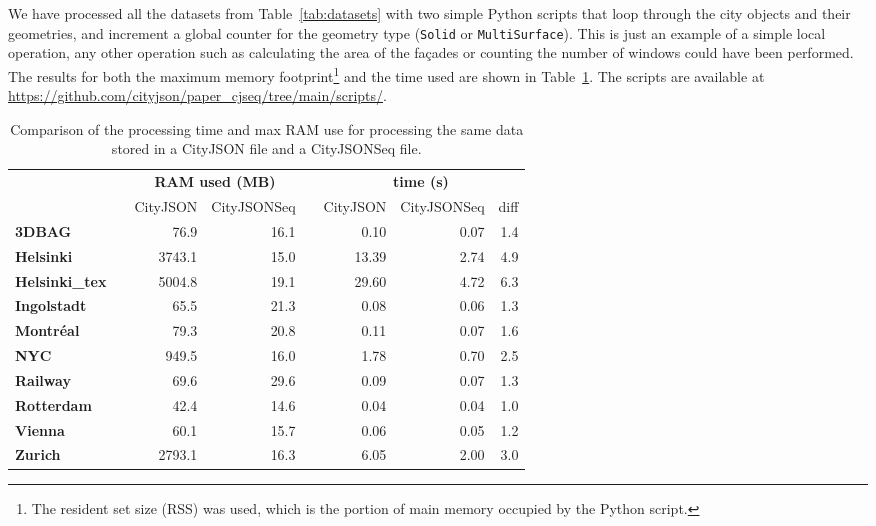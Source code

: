 \documentclass{isprs} %
\begin{document}
We have processed all the datasets from Table~\ref{tab:datasets} with two simple Python scripts that loop through the city objects and their geometries, and increment a global counter for the geometry type (\texttt{Solid} or \texttt{MultiSurface}).
This is just an example of a simple local operation, any other operation such as calculating the area of the façades or counting the number of windows could have been performed.
The results for both the maximum memory footprint\footnote{The resident set size (RSS) was used, which is the portion of main memory occupied by the Python script.} and the time used are shown in Table~\ref{tab:ramtime}.
The scripts are available at \url{https://github.com/cityjson/paper_cjseq/tree/main/scripts/}.
\begin{table}
  \centering
  \caption{Comparison of the processing time and max RAM use for processing the same data stored in a CityJSON file and a CityJSONSeq file.}
  \small
  \begin{tabular}
    {@{}lcrrcrrr@{}}\toprule
    &&  \multicolumn{2}{c}{\textbf{RAM used (MB)}} && \multicolumn{3}{c}{\textbf{time (s)}} \\ 
    \cmidrule{3-4} \cmidrule{6-8} 
     && CityJSON & CityJSONSeq && CityJSON & CityJSONSeq & diff \\
    \midrule
     \textbf{3DBAG}         &&   76.9 & 16.1  &&   0.10 & 0.07 & 1.4 \\
     \textbf{Helsinki}      && 3743.1 & 15.0  &&  13.39 & 2.74 & 4.9 \\
     \textbf{Helsinki\_tex} && 5004.8 & 19.1  &&  29.60 & 4.72 & 6.3 \\
     \textbf{Ingolstadt}    &&   65.5 & 21.3  &&   0.08 & 0.06 & 1.3 \\
     \textbf{Montréal}      &&   79.3 & 20.8  &&   0.11 & 0.07 & 1.6 \\
     \textbf{NYC}           &&  949.5 & 16.0  &&   1.78 & 0.70 & 2.5 \\
     \textbf{Railway}       &&   69.6 & 29.6  &&   0.09 & 0.07 & 1.3 \\
     \textbf{Rotterdam}     &&   42.4 & 14.6  &&   0.04 & 0.04 & 1.0 \\
     \textbf{Vienna}        &&   60.1 & 15.7  &&   0.06 & 0.05 & 1.2 \\
     \textbf{Zurich}        && 2793.1 & 16.3  &&   6.05 & 2.00 & 3.0 \\
    \bottomrule
  \end{tabular}%
  \label{tab:ramtime}
\end{table}
\end{document}
